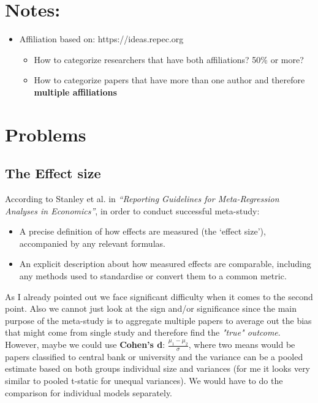 \documentclass{article}
\begin{document}
\section{Notes:}

\begin{itemize}
    \item Affiliation based on: https://ideas.repec.org
        \begin{itemize}
            \item How to categorize researchers that have both affiliations? 50\% or more?
            \item How to categorize papers that have more than one author and therefore \textbf{multiple affiliations}  
        \end{itemize}
\end{itemize}


\section{Problems}

\subsection*{The Effect size}

According to Stanley et al. in \textit{“Reporting Guidelines for Meta-Regression Analyses in Economics”}, in order to conduct successful meta-study:
\begin{itemize}
    \item A precise definition of how effects are measured (the ‘effect size’), accompanied by any relevant formulas.
    \item An explicit description about how measured effects are comparable, including any methods used to standardise or convert them to a common metric.
\end{itemize}

\newline \noindent
As I already pointed out we face significant difficulty when it comes to the second point. Also we cannot just look at the sign and/or significance since the main purpose of the meta-study is to aggregate multiple papers to average out the bias that might come from single study and therefore find the \textit{"true" outcome}.   \\

\newline \noindent
However, maybe we could use \textbf{Cohen’s d}: $\frac{\mu_1 - \mu_2}{\sigma}$, where two means would be papers classified to central bank or university and the variance can be a pooled estimate based on both groups individual size and variances (for me it looks very similar to pooled t-static for unequal variances). We would have to do the comparison for individual models separately. \\
\end{document}
